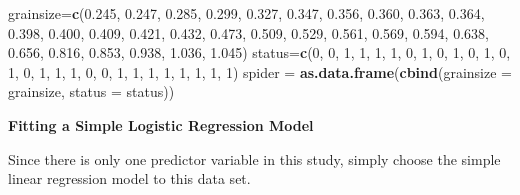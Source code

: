 \documentclass[
]{book}
\newenvironment{Shaded}{\begin{snugshade}}{\end{snugshade}}
\newcommand{\AttributeTok}[1]{\textcolor[rgb]{0.13,0.29,0.53}{#1}}
\newcommand{\DecValTok}[1]{\textcolor[rgb]{0.00,0.00,0.81}{#1}}
\newcommand{\FloatTok}[1]{\textcolor[rgb]{0.00,0.00,0.81}{#1}}
\newcommand{\FunctionTok}[1]{\textcolor[rgb]{0.13,0.29,0.53}{\textbf{#1}}}
\newcommand{\NormalTok}[1]{#1}
\newcommand{\OtherTok}[1]{\textcolor[rgb]{0.56,0.35,0.01}{#1}}
\newcommand{\SpecialCharTok}[1]{\textcolor[rgb]{0.81,0.36,0.00}{\textbf{#1}}}
\newcommand{\StringTok}[1]{\textcolor[rgb]{0.31,0.60,0.02}{#1}}
\begin{document}
\begin{Shaded}
\begin{Highlighting}[]
\NormalTok{grainsize}\OtherTok{=}\FunctionTok{c}\NormalTok{(}\FloatTok{0.245}\NormalTok{, }\FloatTok{0.247}\NormalTok{, }\FloatTok{0.285}\NormalTok{, }\FloatTok{0.299}\NormalTok{, }\FloatTok{0.327}\NormalTok{, }\FloatTok{0.347}\NormalTok{, }\FloatTok{0.356}\NormalTok{, }\FloatTok{0.360}\NormalTok{, }\FloatTok{0.363}\NormalTok{, }\FloatTok{0.364}\NormalTok{, }
            \FloatTok{0.398}\NormalTok{, }\FloatTok{0.400}\NormalTok{, }\FloatTok{0.409}\NormalTok{, }\FloatTok{0.421}\NormalTok{, }\FloatTok{0.432}\NormalTok{, }\FloatTok{0.473}\NormalTok{, }\FloatTok{0.509}\NormalTok{, }\FloatTok{0.529}\NormalTok{, }\FloatTok{0.561}\NormalTok{, }\FloatTok{0.569}\NormalTok{, }
            \FloatTok{0.594}\NormalTok{, }\FloatTok{0.638}\NormalTok{, }\FloatTok{0.656}\NormalTok{, }\FloatTok{0.816}\NormalTok{, }\FloatTok{0.853}\NormalTok{, }\FloatTok{0.938}\NormalTok{, }\FloatTok{1.036}\NormalTok{, }\FloatTok{1.045}\NormalTok{)}
\NormalTok{status}\OtherTok{=}\FunctionTok{c}\NormalTok{(}\DecValTok{0}\NormalTok{, }\DecValTok{0}\NormalTok{, }\DecValTok{1}\NormalTok{, }\DecValTok{1}\NormalTok{, }\DecValTok{1}\NormalTok{, }\DecValTok{1}\NormalTok{, }\DecValTok{0}\NormalTok{, }\DecValTok{1}\NormalTok{, }\DecValTok{0}\NormalTok{, }\DecValTok{1}\NormalTok{, }\DecValTok{0}\NormalTok{, }\DecValTok{1}\NormalTok{, }\DecValTok{0}\NormalTok{, }\DecValTok{1}\NormalTok{, }\DecValTok{0}\NormalTok{, }\DecValTok{1}\NormalTok{, }\DecValTok{1}\NormalTok{, }\DecValTok{1}\NormalTok{, }\DecValTok{0}\NormalTok{, }\DecValTok{0}\NormalTok{, }\DecValTok{1}\NormalTok{, }\DecValTok{1}\NormalTok{, }\DecValTok{1}\NormalTok{, }\DecValTok{1}\NormalTok{, }
         \DecValTok{1}\NormalTok{, }\DecValTok{1}\NormalTok{, }\DecValTok{1}\NormalTok{, }\DecValTok{1}\NormalTok{)}
\NormalTok{spider }\OtherTok{=} \FunctionTok{as.data.frame}\NormalTok{(}\FunctionTok{cbind}\NormalTok{(}\AttributeTok{grainsize =}\NormalTok{ grainsize, }\AttributeTok{status =}\NormalTok{ status))}
\end{Highlighting}
\end{Shaded}

\textbf{Fitting a Simple Logistic Regression Model}

Since there is only one predictor variable in this study, simply choose the simple linear regression model to this data set.

\begin{Shaded}
\end{Shaded}
\end{document}
